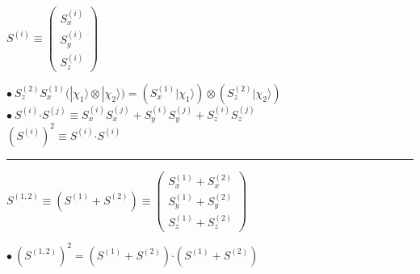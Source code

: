 \documentclass[12pt]{article}
\newcommand*{\dotP}{\boldsymbol \cdot}	%
\begin{document}
\vspace{1.5cm} \noindent
\begin{minipage}[t]{.5\textwidth}
    \begin{center} \( 
        S^{(i)} \equiv 
        \left( \begin{matrix} 
            S^{(i)}_x\\[5pt] 
            S^{(i)}_y\\[5pt] 
            S^{(i)}_z 
        \end{matrix}\right) 
    \) \end{center}
        
    \vspace{5pt}
    \( \bullet \ S^{(2)}_z S^{(1)}_x \Big( | \chi_1 \rangle \otimes | \chi_2 \rangle \Big)
        = \left( S^{(1)}_x | \chi_1 \rangle \right) \otimes \left( S^{(2)}_z | \chi_2 \rangle \right) \)\\[10pt]
    \( \bullet \ S^{(i)} \dotP S^{(j)} \equiv S^{(i)}_x S^{(j)}_x + S^{(i)}_y S^{(j)}_y + S^{(i)}_z S^{(j)}_z \)\\[10pt]
    \setlength{\parindent}{.5cm}
    \indent \( ( S^{(i)} )^2 \equiv S^{(i)} \dotP S^{(i)} \)\\[10pt]    
\end{minipage}
\hspace{.020\textwidth}
\rule[-120pt]{.5pt}{150pt}
\hspace{.025\textwidth}
\begin{minipage}[t]{.45\textwidth}
    \begin{center} \( 
        S^{(1,2)} \equiv \left( S^{(1)} + S^{(2)} \right) \equiv 
        \left( \begin{matrix} S^{(1)}_x + S^{(2)}_x \\[5pt]
            S^{(1)}_y + S^{(2)}_y \\[5pt]
            S^{(1)}_z + S^{(2)}_z 
        \end{matrix} \right) 
    \) \end{center}

    \vspace{5pt}
    \( \bullet \ \left( S^{(1,2)} \right)^2 =
        \left( S^{(1)} + S^{(2)} \right) \dotP \left( S^{(1)} + S^{(2)} \right) \)
\end{minipage}
\end{document}
